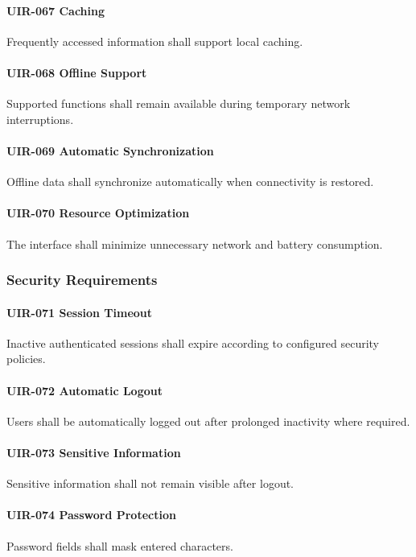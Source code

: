 \paragraph{UIR-067 Caching}
Frequently accessed information shall support local caching.

\paragraph{UIR-068 Offline Support}
Supported functions shall remain available during temporary network
interruptions.

\paragraph{UIR-069 Automatic Synchronization}
Offline data shall synchronize automatically when connectivity is
restored.

\paragraph{UIR-070 Resource Optimization}
The interface shall minimize unnecessary network and battery
consumption.

\subsubsection*{Security Requirements}

\paragraph{UIR-071 Session Timeout}
Inactive authenticated sessions shall expire according to configured
security policies.

\paragraph{UIR-072 Automatic Logout}
Users shall be automatically logged out after prolonged inactivity where
required.

\paragraph{UIR-073 Sensitive Information}
Sensitive information shall not remain visible after logout.

\paragraph{UIR-074 Password Protection}
Password fields shall mask entered characters.

